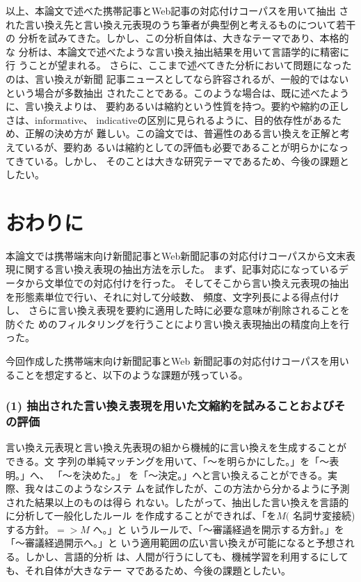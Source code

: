 \documentclass[jnlpbbl]{jnlp_j}
\begin{document}
以上、本論文で述べた携帯記事とWeb記事の対応付けコーパスを用いて抽出
された言い換え先と言い換え元表現のうち筆者が典型例と考えるものについて若干の
分析を試みてきた。しかし、この分析自体は、大きなテーマであり、本格的な
分析は、本論文で述べたような言い換え抽出結果を用いて言語学的に精密に行
うことが望まれる。
さらに、ここまで述べてきた分析において問題になったのは、言い換えが新聞
記事ニュースとしてなら許容されるが、一般的ではないという場合が多数抽出
されたことである。このような場合は、既に述べたように、言い換えよりは、
要約あるいは縮約という性質を持つ。要約や縮約の正しさは、informative、
indicativeの区別に見られるように、目的依存性があるため、正解の決め方が
難しい。この論文では、普遍性のある言い換えを正解と考えているが、要約あ
るいは縮約としての評価も必要であることが明らかになってきている。しかし、
そのことは大きな研究テーマであるため、今後の課題としたい。

\section{おわりに}

本論文では携帯端末向け新聞記事とWeb新聞記事の対応付けコーパスから文末表
現に関する言い換え表現の抽出方法を示した。
まず、記事対応になっているデータから文単位での対応付けを行った。
そしてそこから言い換え元表現の抽出を形態素単位で行い、それに対して分岐数、
頻度、文字列長による得点付けし、
さらに言い換え表現を要約に適用した時に必要な意味が削除されることを防ぐた
めのフィルタリングを行うことにより言い換え表現抽出の精度向上を行った。

今回作成した携帯端末向け新聞記事とWeb 新聞記事の対応付けコーパスを用い
ることを想定すると、以下のような課題が残っている。

\subsubsection*{(1) 抽出された言い換え表現を用いた文縮約を試みることおよびその評価}

言い換え元表現と言い換え先表現の組から機械的に言い換えを生成することが
できる。文
字列の単純マッチングを用いて、「〜を明らかにした。」を「〜表明。」へ、
「〜を決めた。」
を「〜決定。」へと言い換えることができる。実際、我々はこのようなシステ
ムを試作したが、この方法から分かるように予測された結果以上のものは得ら
れない。したがって、抽出した言い換えを言語的に分析して一般化したルール
を作成することができれば、「を$M($ 名詞サ変接続) する方針。$=> M$ へ。」と
いうルールで、「〜審議経過を開示する方針。」を「〜審議経過開示へ。」と
いう適用範囲の広い言い換えが可能になると予想される。しかし、言語的分析
は、人間が行うにしても、機械学習を利用するにしても、それ自体が大きなテー
マであるため、今後の課題としたい。
\end{document}
